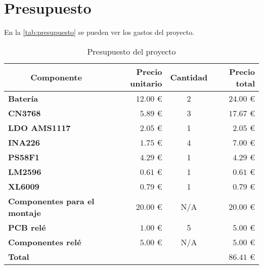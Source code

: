 \section{Presupuesto}
En la \autoref{tab:presupuesto} se pueden ver los gastos del proyecto.

\begin{table}[H]
    \centering
    \begin{tabular}{lrcr}
    \toprule
    \multicolumn{1}{c}{\textbf{Componente}}  & {\textbf{Precio unitario}}   & {\textbf{Cantidad}} & {\textbf{Precio total}}   \\ \midrule
    \textbf{Batería}                         & {$12.00$ \euro}              & {2}                 & {$24.00$ \euro}           \\ 
    \textbf{CN3768}                          & {$5.89$ \euro}               & {3}                 & {$17.67$ \euro}           \\ 
    \textbf{LDO AMS1117}                     & {$2.05$ \euro}               & {1}                 & {$2.05$ \euro}            \\ 
    \textbf{INA226}                          & {$1.75$ \euro}               & {4}                 & {$7.00$ \euro}            \\ 
    \textbf{PS58F1}                          & {$4.29$ \euro}               & {1}                 & {$4.29$ \euro}            \\ 
    \textbf{LM2596}                          & {$0.61$ \euro}               & {1}                 & {$0.61$ \euro}            \\ 
    \textbf{XL6009}                          & {$0.79$ \euro}               & {1}                 & {$0.79$ \euro}            \\ 
    \textbf{Componentes para el montaje}     & {$20.00$ \euro}              & {N/A}               & {$20.00$ \euro}           \\ 
    \textbf{PCB relé}                        & {$1.00$ \euro}               & {5}                 & {$5.00$ \euro}            \\ 
    \textbf{Componentes relé}                & {$5.00$ \euro}               & {N/A}               & {$5.00$ \euro}            \\ \midrule
    \textbf{Total}                           & { }                          & { }                 & {$86.41$ \euro}           \\ \bottomrule
    \end{tabular}
    \caption{Presupuesto del proyecto}
    \label{tab:presupuesto}
\end{table}